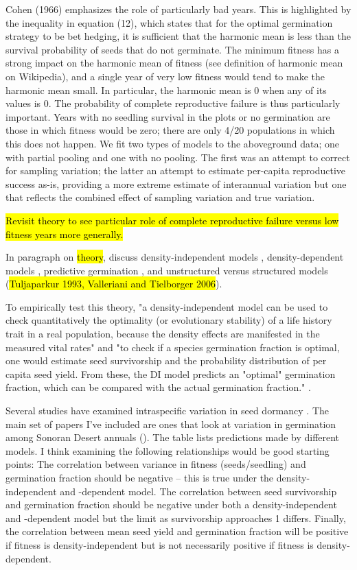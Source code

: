 \documentclass[12pt, oneside, titlepage]{article}   	%
\begin{document}
Cohen (1966) emphasizes the role of particularly bad years. This is highlighted by the inequality in equation (12), which states that for the optimal germination strategy to be bet hedging, it is sufficient that the harmonic mean is less than the survival probability of seeds that do not germinate. The minimum fitness has a strong impact on the harmonic mean of fitness (see definition of harmonic mean on Wikipedia), and a single year of very low fitness would tend to make the harmonic mean small. In particular, the harmonic mean is 0 when any of its values is 0. The probability of complete reproductive failure is thus particularly important. Years with no seedling survival in the plots or no germination are those in which fitness would be zero; there are only 4/20 populations in which this does not happen. We fit two types of models to the aboveground data; one with partial pooling and one with no pooling. The first was an attempt to correct for sampling variation; the latter an attempt to estimate per-capita reproductive success as-is, providing a more extreme estimate of interannual variation but one that reflects the combined effect of sampling variation and true variation.

\hl{Revisit theory to see particular role of complete reproductive failure versus low fitness years more generally.}

In paragraph on \hl{theory}, discuss density-independent models \cite{cohen1966,cohen1968}, density-dependent models \cite{ellner1985,ellner1985a}, predictive germination \cite{cohen1967}, and unstructured versus structured models \cite{easterling2000} (\hl{Tuljaparkur 1993, Valleriani and Tielborger 2006}).

To empirically test this theory, "a density-independent model can be used to check quantitatively the optimality (or evolutionary stability) of a life history trait in a real population, because the density effects are manifested in the measured vital rates" and "to check if a species germination fraction is optimal, one would estimate seed survivorship and the probability distribution of per capita seed yield. From these, the DI model predicts an "optimal" germination fraction, which can be compared with the actual germination fraction." \cite{ellner1985a}.

Several studies have examined intraspecific variation in seed dormancy \cite{hacker1984,hacker1989,philippi1993a,clauss2000}. The main set of papers I've included are ones that look at variation in germination among Sonoran Desert annuals (\cite{venable2007,gremer2014,gremer2016}). The table lists predictions made by different models. I think examining the following relationships would be good starting points: The correlation between variance in fitness (seeds/seedling) and germination fraction should be negative -- this is true under the density-independent and -dependent model. The correlation between seed survivorship and germination fraction should be negative under both a density-independent and -dependent model but the limit as survivorship approaches 1 differs. Finally, the correlation between mean seed yield and germination fraction will be positive if fitness is density-independent but is not necessarily positive if fitness is density-dependent.
\end{document}
